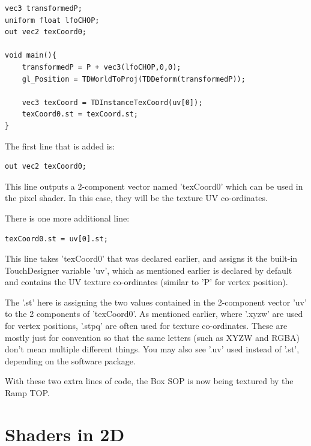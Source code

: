 \begin{fullwidth}
\begin{lstlisting}
vec3 transformedP;
uniform float lfoCHOP;
out vec2 texCoord0;

void main(){
	transformedP = P + vec3(lfoCHOP,0,0);
	gl_Position = TDWorldToProj(TDDeform(transformedP));

	vec3 texCoord = TDInstanceTexCoord(uv[0]);
	texCoord0.st = texCoord.st;
}
\end{lstlisting}

The first line that is added is:

\begin{lstlisting}
out vec2 texCoord0;
\end{lstlisting}

This line outputs a 2-component vector named 'texCoord0' which can be used in the pixel shader. In this case, they will be the texture UV co-ordinates.

There is one more additional line:

\begin{lstlisting}
texCoord0.st = uv[0].st;
\end{lstlisting}

This line takes 'texCoord0' that was declared earlier, and assigns it the built-in TouchDesigner variable 'uv', which as mentioned earlier is declared by default and contains the UV texture co-ordinates (similar to 'P' for vertex position). 

The '.st' here is assigning the two values contained in the 2-component vector 'uv' to the 2 components of 'texCoord0'. As mentioned earlier, where '.xyzw' are used for vertex positions, '.stpq' are often used for texture co-ordinates. These are mostly just for convention so that the same letters (such as XYZW and RGBA) don't mean multiple different things. You may also see '.uv' used instead of '.st', depending on the software package. 

With these two extra lines of code, the Box SOP is now being textured by the Ramp TOP.

\end{fullwidth}


\section{Shaders in 2D}

